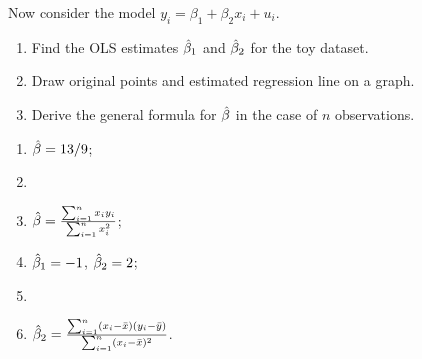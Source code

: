 \begin{problem}
\begin{translationen}
Now consider the model $y_i = \beta_1 + \beta_2 x_i + u_i$.
\begin{enumerate}[resume]
\item Find the OLS estimates $\hat{\beta}_1$ and $\hat{\beta}_2$ for the toy dataset.
\item Draw original points and estimated regression line on a graph.
\item Derive the general formula for $\hat{\beta}$ in the case of $n$ observations.
\end{enumerate}
\end{translationen}

\begin{sol}
\begin{enumerate}
\item $\hat{\beta} = 13/9$;
\item 
\item $\hat{\beta} = \frac{\sum_{i=1}^n x_i y_i}{\sum_{i=1}^n x_i^2}$;
\item $\hat{\beta}_1 = -1$, $\hat{\beta}_2 = 2$;
\item 
\item $\hat{\beta}_2 = \frac{\sum_{i=1}^n (x_i - \bar x)(y_i - \bar y)}{\sum_{i=1}^n (x_i - \bar x)^2}$.
\end{enumerate}
\end{sol}
\end{problem}


